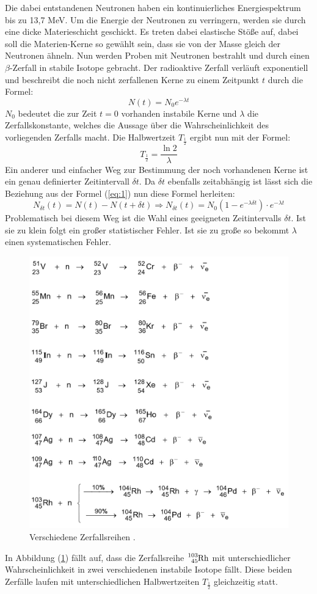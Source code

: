 Die dabei entstandenen Neutronen haben ein kontinuierliches Energiespektrum bis zu 13,7 MeV. Um die Energie der Neutronen zu verringern, werden sie durch eine
dicke Materieschicht geschickt. Es treten dabei elastische Stöße auf, dabei soll die
Materien-Kerne so gewählt sein, dass sie von der Masse gleich der Neutronen ähneln.
Nun werden Proben mit Neutronen bestrahlt und durch einen $\beta$-Zerfall in stabile Isotope gebracht.
Der radioaktive Zerfall verläuft exponentiell und beschreibt die noch nicht zerfallenen Kerne zu einem Zeitpunkt $t$ durch die Formel:
\begin{equation}
  N(t)= N_0 e^{-\lambda t}
  \label{eq:1}
\end{equation}
$N_0$ bedeutet die zur Zeit $t = 0$ vorhanden instabile Kerne und $\lambda$ die Zerfallskonstante, welches die Aussage über die Wahrscheinlichkeit
des vorliegenden Zerfalls macht.
Die Halbwertzeit $T_{\frac{1}{2}}$ ergibt nun mit der Formel:
\begin{equation}
  T_{\frac{1}{2}} = \frac{\ln 2}{\lambda}
  \label{eq:2}
\end{equation}
Ein anderer und einfacher Weg zur Bestimmung der noch vorhandenen Kerne ist
ein genau definierter Zeitintervall $\delta t$.
Da $\delta t$ ebenfalls zeitabhängig ist lässt sich die Beziehung aus der Formel (\ref{eq:1})
nun diese Formel herleiten:
\begin{equation}
  N_{\delta t} (t) = N(t) - N(t+\delta t) \Rightarrow N_{\delta t} (t) =N_0 (1-e^{-\lambda \delta t}) \cdot e^{-\lambda t}
  \label{eq:3}
\end{equation}
Problematisch bei diesem Weg ist die Wahl eines geeigneten Zeitintervalls $\delta t$. Ist sie zu klein folgt ein großer statistischer Fehler.
Ist sie zu große so bekommt $\lambda$ einen systematischen Fehler.
\begin{figure}
  \includegraphics[width=\textwidth]{content/Verlauf.jpg}
  \caption{Verschiedene Zerfallsreihen \cite{1}.}
  \label{abb:1}
\end{figure}
In Abbildung (\ref{abb:1}) fällt auf, dass die Zerfallsreihe $\ce{^{103}_{45}Rh}$ mit unterschiedlicher Wahrscheinlichkeit
in zwei verschiedenen instabile Isotope fällt.
Diese beiden Zerfälle laufen mit unterschiedlichen Halbwertzeiten $T_{\frac{1}{2}}$ gleichzeitig statt.

